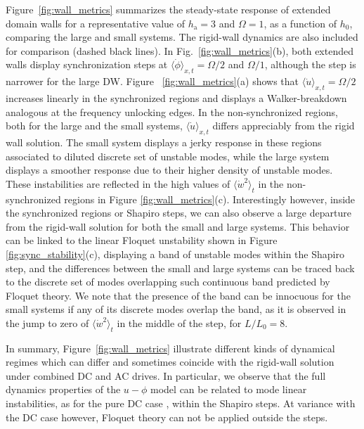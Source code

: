 \documentclass[prb,aps,twocolumn,superscriptaddress,floatfix]{revtex4-1}
\newcommand{\aleadd}[1]{{\color{blue}#1}}
\newcommand{\luzcom}[1]{{\color{green!50!black}#1}}
\begin{document}
\aleadd{
Figure~\ref{fig:wall_metrics} summarizes the steady-state response of extended domain walls for a representative value of $h_\text{a}=3$ and $\Omega=1$, as a function of $h_0$, comparing the large and small systems. The rigid-wall dynamics are also included for comparison (dashed black lines). In Fig.~\ref{fig:wall_metrics}(b), both extended walls display synchronization steps at $\langle\dot\phi\rangle_{x,t}=\Omega/2$ and $\Omega/1$, although the step is narrower for the large DW. Figure ~\ref{fig:wall_metrics}(a) shows that $\langle\dot u \rangle_{x,t}=\Omega/2$ increases linearly in the synchronized regions and displays a Walker-breakdown analogous at the frequency unlocking edges. In the non-synchronized regions, both for the large and the small systems, $\langle\dot u \rangle_{x,t}$ differs appreciably from the rigid wall solution. The small system displays a jerky response in these regions associated to diluted discrete set of unstable modes, while the large system displays a smoother response due to their higher density of unstable modes. These instabilities are reflected in the high values of $\langle\dot w^2 \rangle_{t}$ in the non-synchronized regions in Figure \ref{fig:wall_metrics}(c). Interestingly however, inside the synchronized regions or Shapiro steps, we can also observe a large departure from the rigid-wall solution for both the small and large systems. This behavior can be linked to the linear Floquet unstability shown in Figure \ref{fig:sync_stability}(c), displaying a band of unstable modes within the Shapiro step, and the differences between the small and large systems can be traced back to the discrete set of modes overlapping such continuous band predicted by Floquet theory. We note that the presence of the band can be innocuous for the small systems if any of its discrete modes overlap the band, as it is observed 
in the jump to zero of $\langle\dot w^2 \rangle_{t}$ in the middle of the step, for $L/L_0=8$.
}

\aleadd{In summary, Figure~\ref{fig:wall_metrics} 
illustrate different kinds of dynamical regimes which can differ and sometimes coincide with the rigid-wall solution under combined DC and AC drives. In particular, we observe that the full dynamics properties of the $u-\phi$ model can be related to mode linear instabilities, as for the pure DC case \cite{pusiol2026deterministic}, within the Shapiro steps. At variance with the DC case however, Floquet theory can not be applied outside the steps.
}

\end{document}
